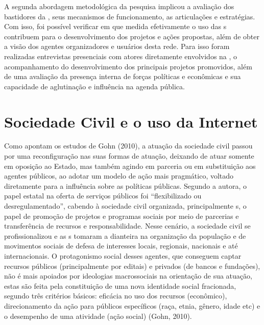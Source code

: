 A segunda abordagem metodológica da pesquisa implicou a avaliação dos
bastidores da , seus mecanismos de funcionamento, as articulações e
estratégias. Com isso, foi possível verificar em que medida efetivamente
o uso das s contribuem para o desenvolvimento dos projetos e ações
propostas, além de obter a visão dos agentes organizadores e usuários
desta rede. Para isso foram realizadas entrevistas presenciais com
atores diretamente envolvidos na , o acompanhamento do
desenvolvimento dos principais projetos promovidos, além de uma
avaliação da presença interna de forças políticas e econômicas e sua
capacidade de aglutinação e influência na agenda pública.

\section{Sociedade Civil e o uso da Internet}

Como apontam os estudos de Gohn (2010), a atuação da sociedade civil
passou por uma reconfiguração nas suas formas de atuação, deixando de
atuar somente em oposição ao Estado, mas também agindo em parceria ou em
substituição aos agentes públicos, ao adotar um modelo de ação mais
pragmático, voltado diretamente para a influência sobre as políticas
públicas. Segundo a autora, o papel estatal na oferta de serviços
públicos foi ``flexibilizado ou desregulamentado'', cabendo à sociedade
civil organizada, principalmente s, o papel de promoção de projetos e
programas sociais por meio de parcerias e transferência de recursos e
responsabilidade. Nesse cenário, a sociedade civil se profissionalizou e
as s tomaram a dianteira na organização da população e de movimentos
sociais de defesa de interesses locais, regionais, nacionais e até
internacionais. O protagonismo social desses agentes, que conseguem
captar recursos públicos (principalmente por editais) e privados (de
bancos e fundações), não é mais apoiados por ideologias macrossociais na
orientação de sua atuação, estas são feita pela constituição de uma nova
identidade social fracionada, segundo três critérios básicos: eficácia
no uso dos recursos (econômico), direcionamento da ação para públicos
específicos (raça, etnia, gênero, idade etc) e o desempenho de uma
atividade (ação social) (Gohn, 2010).

